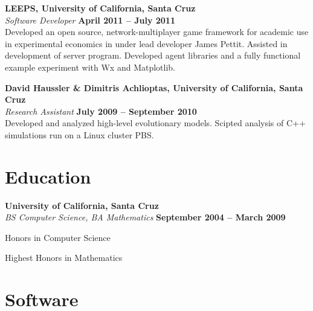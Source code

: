 \documentclass[margin,line]{resume}
\begin{document}
\begin{resume}
    \textbf{LEEPS, University of California, Santa Cruz} \vspace{2mm}\\\vspace{1mm}%
    \textsl{Software Developer} \hfill \textbf{April 2011 -- July 2011}\\
    Developed an open source, network-multiplayer game framework
    for academic use in experimental economics in under lead developer
    James Pettit. Assisted in development of server program. Developed
    agent libraries and a fully functional example experiment with Wx and
    Matplotlib.

    \textbf{David Haussler \& Dimitris Achlioptas, University of California, Santa Cruz} \vspace{2mm}\\\vspace{1mm}%
    \textsl{Research Assistant} \hfill \textbf{July 2009 -- September 2010}\\
    Developed and analyzed high-level evolutionary models. Scipted analysis of C++ simulations
    run on a Linux cluster PBS.

    \section{\mysidestyle Education}

    \textbf{University of California, Santa Cruz} \vspace{2mm}\\\vspace{1mm}%
    \textsl{BS Computer Science, BA Mathematics} \hfill \textbf{September 2004 -- March 2009}\vspace{-3mm}\\\vspace{-1mm}%
    \begin{mylist}
        \item Honors in Computer Science
        \item Highest Honors in Mathematics
    \end{mylist}

    \section{\mysidestyle Software}


\end{resume}
\end{document}
